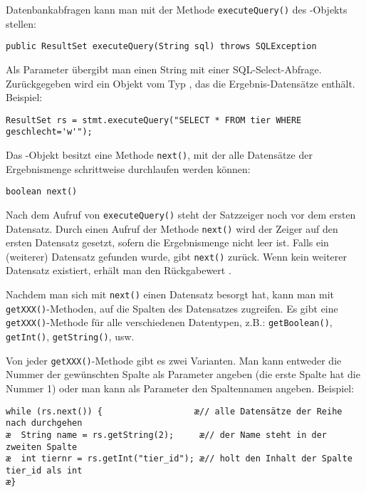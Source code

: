 Datenbankabfragen kann man mit der Methode \lstinline|executeQuery()| des
-Objekts stellen:

\begin{lstlisting}
public ResultSet executeQuery(String sql) throws SQLException
\end{lstlisting}

Als Parameter übergibt man einen String mit einer SQL-Select-Abfrage.
Zurückgegeben wird ein Objekt vom Typ , das die
Ergebnis-Datensätze enthält. Beispiel:

\begin{lstlisting}
ResultSet rs = stmt.executeQuery("SELECT * FROM tier WHERE geschlecht='w'");
\end{lstlisting}

Das -Objekt besitzt eine Methode \lstinline|next()|, mit der
alle Datensätze der Ergebnismenge schrittweise durchlaufen werden können:

\begin{lstlisting}
boolean next()
\end{lstlisting}

Nach dem Aufruf von \lstinline|executeQuery()| steht der Satzzeiger noch vor dem
ersten Datensatz. Durch einen Aufruf der Methode \lstinline|next()| wird der
Zeiger auf den ersten Datensatz gesetzt, sofern die Ergebnismenge nicht leer
ist. Falls ein (weiterer) Datensatz gefunden wurde, gibt \lstinline|next()|
 zurück. Wenn kein weiterer Datensatz existiert, erhält man den
Rückgabewert .

Nachdem man sich mit \lstinline|next()| einen Datensatz besorgt hat, kann man
mit \lstinline|getXXX()|-Methoden, auf die Spalten des Datensatzes zugreifen. Es
gibt eine \lstinline|getXXX()|-Methode für alle verschiedenen Datentypen, z.B.:
\lstinline|getBoolean()|, \lstinline|getInt()|, \lstinline|getString()|, usw.

Von jeder \lstinline|getXXX()|-Methode gibt es zwei Varianten. Man kann entweder
die Nummer der gewünschten Spalte als Parameter angeben (die erste Spalte hat
die Nummer 1) oder man kann als Parameter den Spaltennamen angeben. Beispiel:

\begin{lstlisting}
while (rs.next()) {                  æ// alle Datensätze der Reihe nach durchgehen 
æ  String name = rs.getString(2);     æ// der Name steht in der zweiten Spalte
æ  int tiernr = rs.getInt("tier_id"); æ// holt den Inhalt der Spalte tier_id als int 
æ}
\end{lstlisting}


